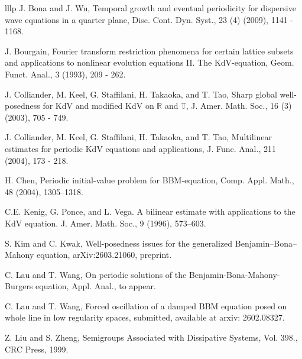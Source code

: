 \documentclass[10pt,a4paper,final]{article}
\numberwithin{equation}{section}
\begin{document}
\begin{thebibliography}{lllp}
 J. Bona and J. Wu, Temporal growth and eventual periodicity for dispersive wave equations in a quarter plane, Disc. Cont. Dyn. Syst., 23 (4) (2009), 1141 - 1168.  


 J. Bourgain, Fourier transform restriction phenomena for certain lattice subsets and applications to nonlinear evolution equations II. The KdV-equation, Geom. Funct. Anal., 3 (1993), 209 - 262. 

 J. Colliander, M. Keel, G. Staffilani, H. Takaoka, and T. Tao, Sharp global well-posedness for KdV and modified KdV on $\mathbb{R}$ and $\mathbb{T}$, J. Amer. Math. Soc., 16 (3) (2003), 705 - 749. 

 J. Colliander, M. Keel, G. Staffilani, H. Takaoka, and T. Tao, Multilinear estimates for periodic KdV equations and applications, J. Func. Anal., 211 (2004), 173 - 218. 

 H. Chen, Periodic initial-value problem for BBM-equation, Comp. Appl. Math., 48 (2004),  1305–1318. 


 C.E. Kenig, G. Ponce, and L. Vega. A bilinear estimate with applications to the KdV equation. J. Amer. Math. Soc., 9 (1996), 573–603. 

 S. Kim and C. Kwak, Well-posedness issues for the generalized Benjamin--Bona--Mahony equation, arXiv:2603.21060, preprint.

  C. Lau and T. Wang, On periodic solutions of the Benjamin-Bona-Mahony-Burgers equation, Appl. Anal., to appear.

 C. Lau and T. Wang, Forced oscillation of a damped BBM equation posed on whole line in low regularity spaces, submitted, available at arxiv: 2602.08327. 


 Z. Liu and S. Zheng, Semigroups Associated with Dissipative Systems, Vol. 398., CRC Press, 1999.


\end{thebibliography}
\end{document}
